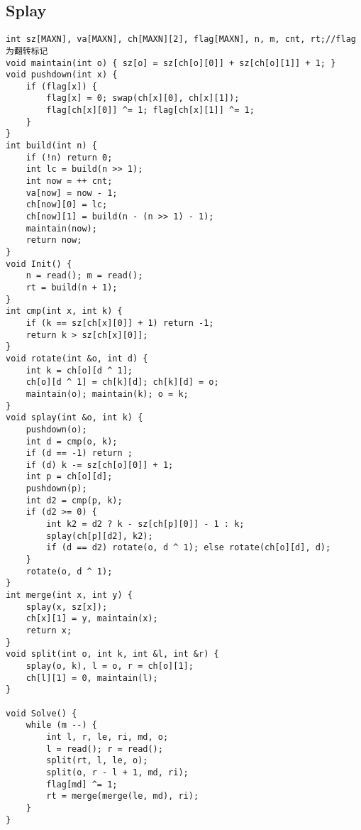 \documentclass[twocolumn,a4]{article}
\begin{document}
\subsection{Splay}
\begin{lstlisting}
int sz[MAXN], va[MAXN], ch[MAXN][2], flag[MAXN], n, m, cnt, rt;//flag为翻转标记
void maintain(int o) { sz[o] = sz[ch[o][0]] + sz[ch[o][1]] + 1; }
void pushdown(int x) {
    if (flag[x]) {
        flag[x] = 0; swap(ch[x][0], ch[x][1]);
        flag[ch[x][0]] ^= 1; flag[ch[x][1]] ^= 1;
    }
}
int build(int n) {
    if (!n) return 0;
    int lc = build(n >> 1);
    int now = ++ cnt;
    va[now] = now - 1;
    ch[now][0] = lc;
    ch[now][1] = build(n - (n >> 1) - 1);
    maintain(now);
    return now;
}
void Init() {
    n = read(); m = read();
    rt = build(n + 1);
}
int cmp(int x, int k) {
    if (k == sz[ch[x][0]] + 1) return -1;
    return k > sz[ch[x][0]];
}
void rotate(int &o, int d) {
    int k = ch[o][d ^ 1];
    ch[o][d ^ 1] = ch[k][d]; ch[k][d] = o;
    maintain(o); maintain(k); o = k;
}
void splay(int &o, int k) {
    pushdown(o);
    int d = cmp(o, k);
    if (d == -1) return ;
    if (d) k -= sz[ch[o][0]] + 1;
    int p = ch[o][d];
    pushdown(p);
    int d2 = cmp(p, k);
    if (d2 >= 0) {
        int k2 = d2 ? k - sz[ch[p][0]] - 1 : k;
        splay(ch[p][d2], k2);
        if (d == d2) rotate(o, d ^ 1); else rotate(ch[o][d], d);
    }
    rotate(o, d ^ 1);
}
int merge(int x, int y) {
    splay(x, sz[x]);
    ch[x][1] = y, maintain(x);
    return x;
}
void split(int o, int k, int &l, int &r) {
    splay(o, k), l = o, r = ch[o][1];
    ch[l][1] = 0, maintain(l);
}

void Solve() {
    while (m --) {
        int l, r, le, ri, md, o;
        l = read(); r = read();
        split(rt, l, le, o);
        split(o, r - l + 1, md, ri);
        flag[md] ^= 1;
        rt = merge(merge(le, md), ri);
    }
}
\end{lstlisting}
\end{document}
